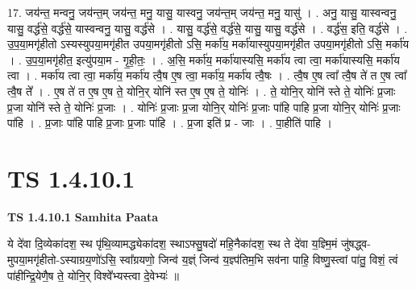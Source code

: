 \documentclass[17pt]{extarticle}
\begin{document}
17. जय॑न्त॒ मन्वनु॒ जय॑न्त॒म् जय॑न्त॒ मनु॒ यासु॒ यास्वनु॒ जय॑न्त॒म् जय॑न्त॒ मनु॒ यासु॑ । . अनु॒ यासु॒ यास्वन्वनु॒ यासु॒ वर्द्ध॑से॒ वर्द्ध॑से॒ यास्वन्वनु॒ यासु॒ वर्द्ध॑से । . यासु॒ वर्द्ध॑से॒ वर्द्ध॑से॒ यासु॒ यासु॒ वर्द्ध॑से । . वर्द्ध॑स॒ इति॒ वर्द्ध॑से । . उ॒प॒या॒मगृ॑हीतो ऽस्यस्युपया॒मगृ॑हीत उपया॒मगृ॑हीतो ऽसि॒ मर्का॑य॒ मर्का॑यास्युपया॒मगृ॑हीत उपया॒मगृ॑हीतो ऽसि॒ मर्का॑य । . उ॒प॒या॒मगृ॑हीत॒ इत्यु॑पया॒म - गृ॒ही॒तः॒ । . अ॒सि॒ मर्का॑य॒ मर्का॑यास्यसि॒ मर्का॑य त्वा त्वा॒ मर्का॑यास्यसि॒ मर्का॑य त्वा । . मर्का॑य त्वा त्वा॒ मर्का॑य॒ मर्का॑य त्वै॒ष ए॒ष त्वा॒ मर्का॑य॒ मर्का॑य त्वै॒षः । . त्वै॒ष ए॒ष त्वा᳚ त्वै॒ष ते॑ त ए॒ष त्वा᳚ त्वै॒ष ते᳚ । . ए॒ष ते॑ त ए॒ष ए॒ष ते॒ योनि॒र् योनि॑ स्त ए॒ष ए॒ष ते॒ योनिः॑ । . ते॒ योनि॒र् योनि॑ स्ते ते॒ योनिः॑ प्र॒जाः प्र॒जा योनि॑ स्ते ते॒ योनिः॑ प्र॒जाः । . योनिः॑ प्र॒जाः प्र॒जा योनि॒र् योनिः॑ प्र॒जाः पा॑हि पाहि प्र॒जा योनि॒र् योनिः॑ प्र॒जाः पा॑हि । . प्र॒जाः पा॑हि पाहि प्र॒जाः प्र॒जाः पा॑हि । . प्र॒जा इति॑ प्र - जाः । . पा॒हीति॑ पाहि । \newline
\pagebreak
{}
\section*{ TS 1.4.10.1 }

\textbf{TS 1.4.10.1 } \newline
\textbf{Samhita Paata} \newline

ये दे॑वा दि॒व्येका॑दश॒ स्थ पृ॑थि॒व्यामद्ध्येका॑दश॒ स्थाऽफ्सु॒षदो॑ महि॒नैका॑दश॒ स्थ ते दे॑वा य॒ज्ञ्मि॒मं जु॑षद्ध्व-मुपया॒मगृ॑हीतो-ऽस्याग्रय॒णो॑ऽसि॒ स्वा᳚ग्रयणो॒ जिन्व॑ य॒ज्ञ्ं जिन्व॑ य॒ज्ञ्प॑तिम॒भि सव॑ना पाहि॒ विष्णु॒स्त्वां पा॑तु॒ विशं॒ त्वं पा॑हीन्द्रि॒येणै॒ष ते॒ योनि॒र् विश्वे᳚भ्यस्त्वा दे॒वेभ्यः॑ ॥ \newline
\end{document}
